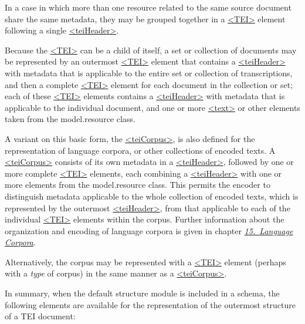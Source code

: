 In a case in which more than one resource related to the same source document share the same metadata, they may be grouped together in a \hyperref[TEI.TEI]{<TEI>} element following a single \hyperref[TEI.teiHeader]{<teiHeader>}.\par
Because the \hyperref[TEI.TEI]{<TEI>} can be a child of itself, a set or collection of documents may be represented by an outermost \hyperref[TEI.TEI]{<TEI>} element that contains a \hyperref[TEI.teiHeader]{<teiHeader>} with metadata that is applicable to the entire set or collection of transcriptions, and then a complete \hyperref[TEI.TEI]{<TEI>} element for each document in the collection or set; each of these \hyperref[TEI.TEI]{<TEI>} elements contains a \hyperref[TEI.teiHeader]{<teiHeader>} with metadata that is applicable to the individual document, and one or more \hyperref[TEI.text]{<text>} or other elements taken from the \textsf{model.resource} class.\par
A variant on this basic form, the \hyperref[TEI.teiCorpus]{<teiCorpus>}, is also defined for the representation of language corpora, or other collections of encoded texts. A \hyperref[TEI.teiCorpus]{<teiCorpus>} consists of its own metadata in a \hyperref[TEI.teiHeader]{<teiHeader>}, followed by one or more complete \hyperref[TEI.TEI]{<TEI>} elements, each combining a \hyperref[TEI.teiHeader]{<teiHeader>} with one or more elements from the \textsf{model.resource} class. This permits the encoder to distinguish metadata applicable to the whole collection of encoded texts, which is represented by the outermost \hyperref[TEI.teiHeader]{<teiHeader>}, from that applicable to each of the individual \hyperref[TEI.TEI]{<TEI>} elements within the corpus. Further information about the organization and encoding of language corpora is given in chapter \textit{\hyperref[CC]{15.\ Language Corpora}}.\par
Alternatively, the corpus may be represented with a \hyperref[TEI.TEI]{<TEI>} element (perhaps with a {\itshape type} of corpus) in the same manner as a \hyperref[TEI.teiCorpus]{<teiCorpus>}.\par
In summary, when the default structure module is included in a schema, the following elements are available for the representation of the outermost structure of a TEI document: 
